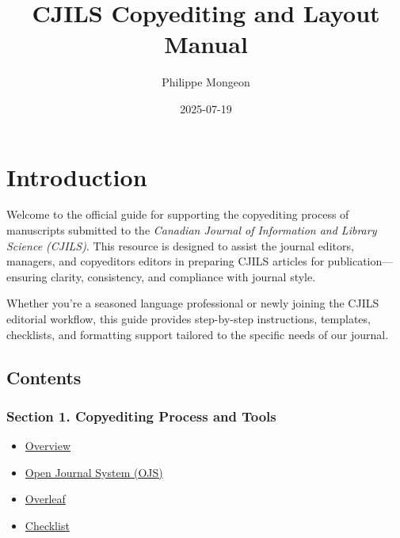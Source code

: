 \documentclass[
  letterpaper,
  DIV=11,
  numbers=noendperiod]{scrreprt}
\title{CJILS Copyediting and Layout Manual}
\author{Philippe Mongeon}
\date{2025-07-19}
\providecommand{\tightlist}{%
  \setlength{\itemsep}{0pt}\setlength{\parskip}{0pt}}\usepackage{longtable,booktabs,array}
\renewcommand*\contentsname{Table of contents}
\newcommand\contentsname{Table of contents}
\begin{document}
\maketitle

\renewcommand*\contentsname{Table of contents}
{
\hypersetup{linkcolor=}
\setcounter{tocdepth}{2}
\tableofcontents
}


\chapter*{Introduction}\label{introduction}


Welcome to the official guide for supporting the copyediting process of
manuscripts submitted to the \emph{Canadian Journal of Information and
Library Science (CJILS)}. This resource is designed to assist the
journal editors, managers, and copyeditors editors in preparing CJILS
articles for publication---ensuring clarity, consistency, and compliance
with journal style.

Whether you're a seasoned language professional or newly joining the
CJILS editorial workflow, this guide provides step-by-step instructions,
templates, checklists, and formatting support tailored to the specific
needs of our journal.

\section*{Contents}\label{contents}


\subsection*{Section 1. Copyediting Process and
Tools}\label{section-1.-copyediting-process-and-tools}

\begin{itemize}
\tightlist
\item
  \href{general.qmd}{Overview}
\item
  \href{ojs.qmd}{Open Journal System (OJS)}
\item
  \href{overleaf.qmd}{Overleaf}
\item
  \href{checklist.qmd}{Checklist}
\end{itemize}
\end{document}
